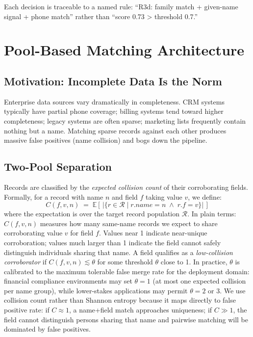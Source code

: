 \documentclass{article}
\begin{document}
Each decision is traceable to a named rule: ``R3d: family match + given-name signal + phone match'' rather than ``score 0.73 > threshold 0.7.''

\section{Pool-Based Matching Architecture}\label{sec:pools}

\subsection{Motivation: Incomplete Data Is the Norm}

Enterprise data sources vary dramatically in completeness. CRM systems typically have partial phone coverage; billing systems tend toward higher completeness; legacy systems are often sparse; marketing lists frequently contain nothing but a name. Matching sparse records against each other produces massive false positives (name collision) and bogs down the pipeline.

\subsection{Two-Pool Separation}

Records are classified by the \emph{expected collision count} of their corroborating fields. Formally, for a record with name $n$ and field $f$ taking value $v$, we define:
\[
  C(f, v, n) \;=\; \mathbb{E}\!\left[\,\bigl|\{r \in \mathcal{R} \mid r.\mathit{name} = n \;\wedge\; r.f = v\}\bigr|\,\right]
\]
where the expectation is over the target record population $\mathcal{R}$. In plain terms: $C(f,v,n)$ measures how many same-name records we expect to share corroborating value $v$ for field $f$. Values near 1 indicate near-unique corroboration; values much larger than 1 indicate the field cannot safely distinguish individuals sharing that name. A field qualifies as a \emph{low-collision corroborator} if $C(f,v,n) \lesssim \theta$ for some threshold $\theta$ close to 1. In practice, $\theta$ is calibrated to the maximum tolerable false merge rate for the deployment domain: financial compliance environments may set $\theta = 1$ (at most one expected collision per name group), while lower-stakes applications may permit $\theta = 2$ or $3$. We use collision count rather than Shannon entropy because it maps directly to false positive rate: if $C \approx 1$, a name+field match approaches uniqueness; if $C \gg 1$, the field cannot distinguish persons sharing that name and pairwise matching will be dominated by false positives.
\end{document}
